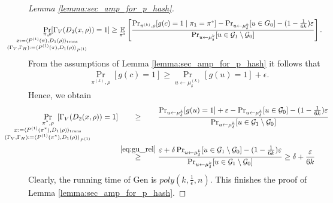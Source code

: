 \begin{proof}[Lemma \ref{lemma:sec_amp_for_p_hash}]
\begin{align*}
  \IndI
\underset{
  \mathclap{
  \substack{\pi, \rho \\ x := \langle P^{(1)}(\pi), D_1(\rho) \rangle_{\text{trans}}
    \\ (\Gamma_V, \Gamma_H) := \langle P^{(1)}(\pi), D_1 (\rho) \rangle_{P^{(1)}} }}}
{\Pr}[\Gamma_V(D_2(x, \rho)) = 1]
&\geq \underset{\pi^*}{\mathbb{E}}\left[\frac{{\Pr}_{\pi^{(k)}, \rho}[g(c) = 1 \mid \pi_1 = \pi^*] -
{\Pr}_{u \leftarrow \mu_{\delta}^{k}}[u \in G_0] - (1 - \frac{1}{6k})\epsilon} {\Pr_{u \leftarrow \mu_{\delta}^{k}}[u \in \cG_1 \setminus \cG_0]}\right] \notag.
 \end{align*}
 From the assumptions of Lemma \ref{lemma:sec_amp_for_p_hash} it follows that
 \begin{align*}
   \Pr_{\pi^{(k)}, \rho} [g(c) = 1] \geq \Pr_{u \leftarrow \mu_{\delta}^{(k)}}[g(u) = 1] + \epsilon.
 \end{align*}
 Hence, we obtain
 \begin{align}
   \label{eq:proof_final}
   \IndI
\underset{
  \mathclap{
  \substack{\pi^*, \rho \\ x := \langle P^{(1)}(\pi^*), D_1(\rho) \rangle_{\text{trans}}
    \\ (\Gamma_V, \Gamma_H) := \langle P^{(1)}(\pi^*), D_1 (\rho) \rangle_{P^{(1)}} }}}
{\Pr}\mkern13mu[\Gamma_V(D_2(x, \rho)) = 1]
 &\stackrel{\hphantom{\eqref{eq:gu_rel}}}{\geq} \frac{ {\Pr}_{u \leftarrow \mu_{\delta}^{k}}[g(u) = 1] + \epsilon -
 \Pr_{u \leftarrow \mu_{\delta}^{k}}[u \in \cG_0] - (1 - \frac{1}{6k})\epsilon} {\Pr_{u \leftarrow \mu_{\delta}^{k}}[u \in \cG_1 \setminus \cG_0]} \notag\\
 &\stackrel{\eqref{eq:gu_rel}}{\geq} \frac{\epsilon + \delta\Pr_{u \leftarrow \mu_{\delta}^{k}}[u \in \cG_1 \setminus \cG_0] - (1 - \frac{1}{6k})\epsilon}
{\Pr_{u \leftarrow \mu_{\delta}^{k}}[u \in \cG_1 \setminus \cG_0]} \geq \delta + \frac{\epsilon}{6k}
\end{align}
Clearly, the running time of Gen is $poly(k, \frac{1}{\epsilon}, n)$.
This finishes the proof of Lemma \ref{lemma:sec_amp_for_p_hash}.
\end{proof}

%
